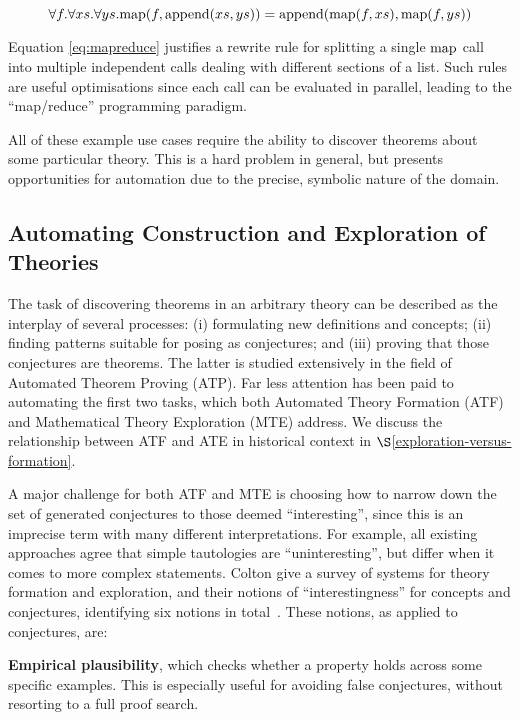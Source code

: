 \begin{equation} \label{eq:mapreduce}
  \forall f. \forall xs. \forall ys.
    \text{map}(f, \text{append}(xs, ys)) = \text{append}(\text{map}(f, xs), \text{map}(f, ys))
\end{equation}

Equation \ref{eq:mapreduce} justifies a rewrite rule for splitting a single
$\text{map}$ call into multiple independent calls dealing with different sections of a
list. Such rules are useful optimisations since each call can be evaluated in
parallel, leading to the ``map/reduce'' programming paradigm.

All of these example use cases require the ability to discover theorems about
some particular theory. This is a hard problem in general, but presents
opportunities for automation due to the precise, symbolic nature of the domain.

\subsection{Automating Construction and Exploration of Theories}
\label{sec:te}

The task of discovering theorems in an arbitrary theory can be
described as the interplay of several processes: (i) formulating new
definitions and concepts; (ii) finding patterns suitable for posing as
conjectures; and (iii) proving that those conjectures are theorems.
The latter is studied extensively in the field of Automated Theorem
Proving (ATP). Far less attention has been paid to automating the
first two tasks, which both Automated Theory Formation (ATF) and
Mathematical Theory Exploration (MTE) address.  We discuss the relationship
between ATF and ATE in historical context in
$\S$\ref{exploration-versus-formation}.

A major challenge for both ATF and MTE is choosing how to narrow down
the set of generated conjectures to those deemed ``interesting'', since this is
an imprecise term with many different interpretations. For example, all existing
approaches agree that simple tautologies are ``uninteresting'', but differ when
it comes to more complex statements.  Colton \etal{} give a survey of systems for
theory formation and exploration, and their notions of ``interestingness'' for
concepts and conjectures, identifying six notions in
total~\cite{colton2000notion}. These notions, as applied to conjectures, are:

{\bf Empirical plausibility}, which checks whether a property holds
across some specific examples. This is especially useful for avoiding
false conjectures, without resorting to a full proof search.

